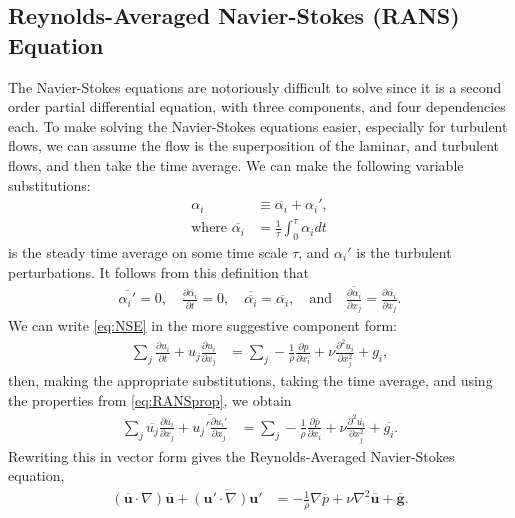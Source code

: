 \documentclass[10pt, titlepage]{article}
\begin{document}
\subsection{Reynolds-Averaged Navier-Stokes (RANS) Equation}
The Navier-Stokes equations are notoriously difficult to solve since it is a second order partial differential equation, with three components, and four dependencies each. To make solving the Navier-Stokes equations easier, especially for turbulent flows, we can assume the flow is the superposition of the laminar, and turbulent flows, and then take the time average. We can make the following variable substitutions:
\begin{align*}
\alpha_i &\equiv \overline{\alpha_i} + \alpha_i', \\
\text{where } \overline{\alpha_i} &= \frac{1}{\tau} \int_0^\tau \alpha_i dt
\end{align*}
is the steady time average on some time scale $\tau$, and $\alpha_i'$ is the turbulent perturbations. It follows from this definition that
\begin{align}
\overline{\alpha_i'} = 0, \quad \frac{\partial \overline{\alpha_i}}{\partial t} = 0, \quad \overline{\overline{\alpha_i}} = \overline{\alpha_i}, \quad \text{and} \quad \overline{\frac{\partial \alpha_i}{\partial x_j}} =  \frac{\partial \overline{\alpha_i}}{\partial x_j}. \label{eq:RANSprop}
\end{align}
We can write \eqref{eq:NSE} in the more suggestive component form:
\begin{align*}
\sum_j \frac{\partial u_i}{\partial t} + u_j \frac{\partial u_i}{\partial x_j} &= \sum_j  -\frac{1}{\rho} \frac{\partial p}{\partial x_i} + \nu \frac{\partial^2 u_i}{\partial x_j^2} + g_i,
\end{align*}
then, making the appropriate substitutions, taking the time average, and using the properties from  \eqref{eq:RANSprop}, we obtain
\begin{align*}
\sum_j \overline{u_j} \frac{\partial \overline{u_i}}{\partial x_j} + \overline{u_j' \frac{\partial u_i'}{\partial x_j}} &= \sum_j  -\frac{1}{\rho} \frac{\partial \overline{p}}{\partial x_i} + \nu \frac{\partial^2 \overline{u_i}}{\partial x_j^2} + \overline{g_i}.
\end{align*}
Rewriting this in vector form gives the Reynolds-Averaged Navier-Stokes equation,
\begin{align}
\left( \mathbf{\overline{u}} \cdot \nabla \right) \mathbf{\overline{u}} + \overline{\left( \mathbf{u'} \cdot \nabla \right) \mathbf{u'}} &= - \frac{1}{\rho} \nabla \overline{p} + \nu \nabla^2 \mathbf{\overline{u}} + \mathbf{\overline{g}}. \label{eq:RANS}
\end{align}
\end{document}
